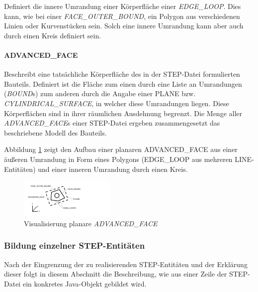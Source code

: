 Definiert die innere Umrandung einer Körperfläche einer \textit{EDGE\_LOOP}. Dies kann, wie bei einer \textit{FACE\_OUTER\_BOUND}, ein Polygon aus verschiedenen Linien oder Kurvenstücken sein. Solch eine innere Umrandung kann aber auch durch einen Kreis definiert sein.   

\paragraph{ADVANCED\_FACE}

Beschreibt eine tatsächliche Körperfläche des in der STEP-Datei formulierten Bauteils. Definiert ist die Fläche zum einen durch eine Liste an Umrandungen (\textit{BOUND}s) zum anderen durch die Angabe einer PLANE bzw. \textit{CYLINDRICAL\_SURFACE}, in welcher diese Umrandungen liegen. Diese Körperflächen sind in ihrer räumlichen Ausdehnung begrenzt. Die Menge aller \textit{ADVANCED\_FACE}s einer STEP-Datei ergeben zusammengesetzt das beschriebene Modell des Bauteils. 

Abbildung \ref{fig:advancedfaceentity} zeigt den Aufbau einer planaren ADVANCED\_FACE aus einer äußeren Umrandung in Form eines Polygons (EDGE\_LOOP aus mehreren LINE-Entitäten) und einer inneren Umrandung durch einen Kreis.  

\begin{figure}[h]
	\centering
	
	\includegraphics[width=\linewidth]{img/advancedface_entity.pdf}
	
	\caption{Visualisierung planare \textit{ADVANCED\_FACE}}
	\label{fig:advancedfaceentity}
	
\end{figure}

\subsubsection{Bildung einzelner STEP-Entitäten}
\label{sec:string2entity}


Nach der Eingrenzung der zu realisierenden STEP-Entitäten und der Erklärung dieser folgt in diesem Abschnitt die Beschreibung, wie aus einer Zeile der STEP-Datei ein konkretes Java-Objekt gebildet wird. 

